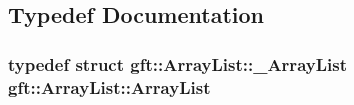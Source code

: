 \subsection{Typedef Documentation}
\hypertarget{namespacegft_1_1ArrayList_a597298ec8b05430a184d37236b272878}{
\subsubsection[{Array\-List}]{\setlength{\rightskip}{0pt plus 5cm}typedef struct {\bf gft\-::\-Array\-List\-::\-\_\-\-Array\-List}  {\bf gft\-::\-Array\-List\-::\-Array\-List}}}\label{namespacegft_1_1ArrayList_a597298ec8b05430a184d37236b272878}


